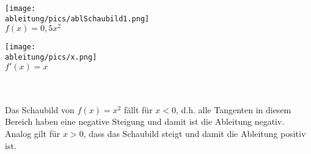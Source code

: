 \begin{minipage}{\textwidth}
	\begin{minipage}{0.49\textwidth}
		\centering\texttt{[image: \\ableitung/pics/ablSchaubild1.png]}\\
		\(f(x)=0,5x^2\)
	\end{minipage}
	\begin{minipage}{0.49\textwidth}
		\centering\texttt{[image: \\ableitung/pics/x.png]}\\
		\(f'(x)=x\)
	\end{minipage}
\end{minipage}\\ \\
Das Schaubild von \(f(x)=x^2\) fällt für \(x<0\), d.h. alle Tangenten in diesem Bereich haben eine negative Steigung und damit ist die Ableitung negativ. Analog gilt für \(x>0\), dass das Schaubild steigt und damit die Ableitung positiv ist.\newpage

